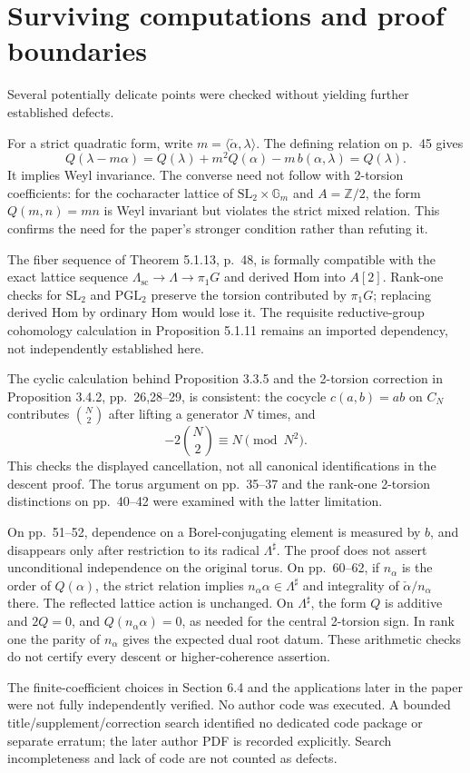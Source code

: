 \documentclass[10pt]{article}
\begin{document}
\section*{Surviving computations and proof boundaries}
Several potentially delicate points were checked without yielding further established defects.\par
For a strict quadratic form, write \(m=\langle\check\alpha,\lambda\rangle\). The defining relation on p. 45 gives \[Q(\lambda-m\alpha)
 =Q(\lambda)+m^2Q(\alpha)-m\,b(\alpha,\lambda)=Q(\lambda).\] It implies Weyl invariance. The converse need not follow with 2-torsion coefficients: for the cocharacter lattice of \(\mathrm{SL}_2\times\mathbb G_m\) and \(A=\mathbb Z/2\), the form \(Q(m,n)=mn\) is Weyl invariant but violates the strict mixed relation. This confirms the need for the paper’s stronger condition rather than refuting it.\par
The fiber sequence of Theorem 5.1.13, p. 48, is formally compatible with the exact lattice sequence \(\Lambda_{\mathrm{sc}}\to\Lambda\to\pi_1G\) and derived Hom into \(A[2]\). Rank-one checks for \(\mathrm{SL}_2\) and \(\mathrm{PGL}_2\) preserve the torsion contributed by \(\pi_1G\); replacing derived Hom by ordinary Hom would lose it. The requisite reductive-group cohomology calculation in Proposition 5.1.11 remains an imported dependency, not independently established here.\par
The cyclic calculation behind Proposition 3.3.5 and the 2-torsion correction in Proposition 3.4.2, pp. 26,28–29, is consistent: the cocycle \(c(a,b)=ab\) on \(C_N\) contributes \(\binom N2\) after lifting a generator \(N\) times, and \[-2\binom N2\equiv N\pmod{N^2}.\] This checks the displayed cancellation, not all canonical identifications in the descent proof. The torus argument on pp. 35–37 and the rank-one 2-torsion distinctions on pp. 40–42 were examined with the latter limitation.\par
On pp. 51–52, dependence on a Borel-conjugating element is measured by \(b\), and disappears only after restriction to its radical \(\Lambda^\sharp\). The proof does not assert unconditional independence on the original torus. On pp. 60–62, if \(n_\alpha\) is the order of \(Q(\alpha)\), the strict relation implies \(n_\alpha\alpha\in\Lambda^\sharp\) and integrality of \(\check\alpha/n_\alpha\) there. The reflected lattice action is unchanged. On \(\Lambda^\sharp\), the form \(Q\) is additive and \(2Q=0\), and \(Q(n_\alpha\alpha)=0\), as needed for the central 2-torsion sign. In rank one the parity of \(n_\alpha\) gives the expected dual root datum. These arithmetic checks do not certify every descent or higher-coherence assertion.\par
The finite-coefficient choices in Section 6.4 and the applications later in the paper were not fully independently verified. No author code was executed. A bounded title/supplement/correction search identified no dedicated code package or separate erratum; the later author PDF is recorded explicitly. Search incompleteness and lack of code are not counted as defects.\par
\end{document}
